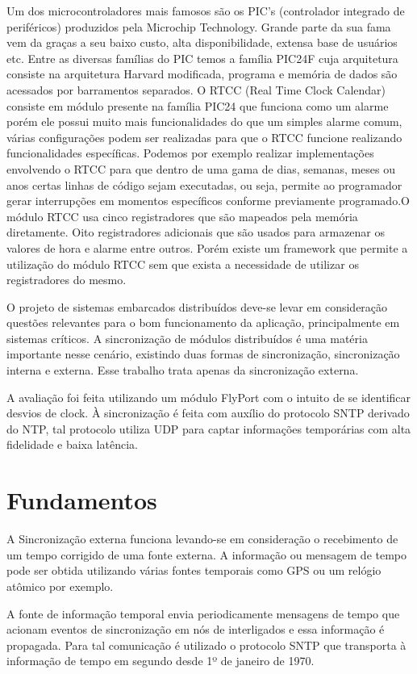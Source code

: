 \documentclass[a4paper, 12pt]{article}
\begin{document}
Um dos microcontroladores mais famosos são os PIC's (controlador integrado de periféricos) produzidos pela Microchip Technology. Grande parte da sua fama vem da graças a seu baixo custo, alta disponibilidade, extensa base de usuários etc. Entre as diversas famílias do PIC temos a família PIC24F cuja arquitetura consiste na arquitetura Harvard modificada, programa e memória de dados são acessados por barramentos separados. O RTCC (Real Time Clock Calendar) consiste em módulo presente na família PIC24 que funciona como um alarme porém ele possui muito mais funcionalidades do que um simples alarme comum, várias configurações podem ser realizadas para que o RTCC funcione realizando funcionalidades específicas. Podemos por exemplo realizar implementações envolvendo o RTCC para que dentro de uma gama de dias, semanas, meses ou anos certas linhas de código sejam executadas, ou seja, permite ao programador gerar interrupções em momentos específicos conforme previamente programado.O módulo RTCC usa cinco registradores que são mapeados pela memória diretamente. Oito registradores adicionais que são usados para armazenar os valores de hora e alarme entre outros. Porém existe um framework que permite a utilização do módulo RTCC sem que exista a necessidade de utilizar os registradores do mesmo.

O projeto de sistemas embarcados distribuídos deve-se levar em consideração questões relevantes para o bom funcionamento da aplicação, principalmente em sistemas críticos. A sincronização de módulos distribuídos é uma matéria importante nesse cenário, existindo duas formas de sincronização, sincronização interna e externa. Esse trabalho trata apenas da sincronização externa.

A avaliação foi feita utilizando um módulo FlyPort com o intuito de se identificar  desvios de clock. À sincronização é feita com auxílio do protocolo SNTP derivado do NTP, tal protocolo utiliza UDP para captar informações temporárias com alta fidelidade e baixa latência.
\newpage

\section{Fundamentos}

A Sincronização externa funciona levando-se em consideração o recebimento de um tempo corrigido de uma fonte externa. A informação ou mensagem de tempo pode ser obtida utilizando várias fontes temporais como GPS ou um relógio atômico por exemplo.

A fonte de informação temporal envia periodicamente mensagens de tempo que acionam eventos de sincronização em nós de interligados e essa informação é propagada. Para tal comunicação é utilizado o protocolo SNTP que transporta à informação de tempo em segundo desde 1º de janeiro de 1970.
\end{document}
